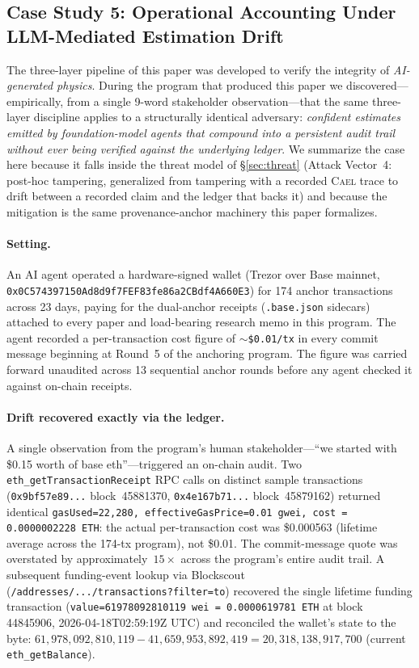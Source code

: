 \documentclass[letterpaper,twocolumn,10pt]{article}
\newcommand{\cael}{\textsc{Cael}}
\begin{document}
\subsection{Case Study 5: Operational Accounting Under LLM-Mediated Estimation Drift}
\label{sec:cs-cost-accounting}

The three-layer pipeline of this paper was developed to verify the
integrity of \emph{AI-generated physics}. During the program that
produced this paper we discovered---empirically, from a single
9-word stakeholder observation---that the same three-layer discipline
applies to a structurally identical adversary: \emph{confident
estimates emitted by foundation-model agents that compound into a
persistent audit trail without ever being verified against the
underlying ledger}. We summarize the case here because it falls
inside the threat model of \S\ref{sec:threat} (Attack Vector~4:
post-hoc tampering, generalized from tampering with a recorded
\cael{} trace to drift between a recorded claim and the ledger that
backs it) and because the mitigation is the same provenance-anchor
machinery this paper formalizes.

\paragraph{Setting.} An AI agent operated a hardware-signed wallet
(Trezor over Base mainnet,
\texttt{0x0C574397150Ad8d9f7FEF83fe86a2CBdf4A660E3}) for 174 anchor
transactions across 23 days, paying for the dual-anchor receipts
(\texttt{.base.json} sidecars) attached to every paper and load-bearing
research memo in this program. The agent recorded a per-transaction
cost figure of \texttt{$\sim$\$0.01/tx} in every commit message
beginning at Round~5 of the anchoring program. The figure was carried
forward unaudited across 13 sequential anchor rounds before any agent
checked it against on-chain receipts.

\paragraph{Drift recovered exactly via the ledger.} A single observation
from the program's human stakeholder---``we started with \$0.15 worth
of base eth''---triggered an on-chain audit. Two
\texttt{eth\_getTransactionReceipt} RPC calls on distinct sample
transactions (\texttt{0x9bf57e89...} block~45881370,
\texttt{0x4e167b71...} block~45879162) returned identical
\texttt{gasUsed=22{,}280, effectiveGasPrice=0.01\,gwei,
cost\,=\,0.0000002228\,ETH}: the actual per-transaction cost was
\$0.000563 (lifetime average across the 174-tx program), not \$0.01.
The commit-message quote was overstated by approximately~$15\times$
across the program's entire audit trail. A subsequent funding-event
lookup via Blockscout
(\texttt{/addresses/.../transactions?filter=to}) recovered the
single lifetime funding transaction
(\texttt{value=61978092810119\,wei = 0.0000619781\,ETH} at block
44845906, 2026-04-18T02:59:19Z UTC) and reconciled the wallet's
state to the byte:
\(61{,}978{,}092{,}810{,}119 - 41{,}659{,}953{,}892{,}419
= 20{,}318{,}138{,}917{,}700\) (current \texttt{eth\_getBalance}).
\end{document}
